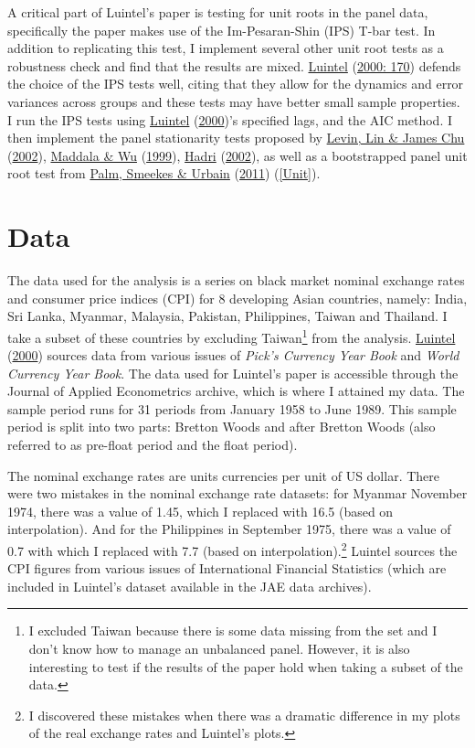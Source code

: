 \documentclass[11pt,preprint, authoryear]{elsarticle}
\numberwithin{equation}{section}
\numberwithin{figure}{section}
\numberwithin{table}{section}
\let\rmarkdownfootnote\footnote%
\def\footnote{\protect\rmarkdownfootnote}
\begin{document}
A critical part of Luintel's paper is testing for unit roots in the
panel data, specifically the paper makes use of the Im-Pesaran-Shin
(IPS) T-bar test. In addition to replicating this test, I implement
several other unit root tests as a robustness check and find that the
results are mixed. \protect\hyperlink{ref-Kul}{Luintel}
(\protect\hyperlink{ref-Kul}{2000: 170}) defends the choice of the IPS
tests well, citing that they allow for the dynamics and error variances
across groups and these tests may have better small sample properties. I
run the IPS tests using \protect\hyperlink{ref-Kul}{Luintel}
(\protect\hyperlink{ref-Kul}{2000})'s specified lags, and the AIC
method. I then implement the panel stationarity tests proposed by
\protect\hyperlink{ref-lev}{Levin, Lin \& James Chu}
(\protect\hyperlink{ref-lev}{2002}), \protect\hyperlink{ref-wu}{Maddala
\& Wu} (\protect\hyperlink{ref-wu}{1999}),
\protect\hyperlink{ref-had}{Hadri} (\protect\hyperlink{ref-had}{2002}),
as well as a bootstrapped panel unit root test from
\protect\hyperlink{ref-pal}{Palm, Smeekes \& Urbain}
(\protect\hyperlink{ref-pal}{2011}) (\ref{Unit}).

\hypertarget{data}{%
\section{\texorpdfstring{Data \label{Data}}{Data }}\label{data}}

The data used for the analysis is a series on black market nominal
exchange rates and consumer price indices (CPI) for 8 developing Asian
countries, namely: India, Sri Lanka, Myanmar, Malaysia, Pakistan,
Philippines, Taiwan and Thailand. I take a subset of these countries by
excluding Taiwan\footnote{I excluded Taiwan because there is some data
  missing from the set and I don't know how to manage an unbalanced
  panel. However, it is also interesting to test if the results of the
  paper hold when taking a subset of the data.} from the analysis.
\protect\hyperlink{ref-Kul}{Luintel} (\protect\hyperlink{ref-Kul}{2000})
sources data from various issues of \emph{Pick's Currency Year Book} and
\emph{World Currency Year Book}. The data used for Luintel's paper is
accessible through the Journal of Applied Econometrics archive, which is
where I attained my data. The sample period runs for 31 periods from
January 1958 to June 1989. This sample period is split into two parts:
Bretton Woods and after Bretton Woods (also referred to as pre-float
period and the float period).

The nominal exchange rates are units currencies per unit of US dollar.
There were two mistakes in the nominal exchange rate datasets: for
Myanmar November 1974, there was a value of 1.45, which I replaced with
16.5 (based on interpolation). And for the Philippines in September
1975, there was a value of 0.7 with which I replaced with 7.7 (based on
interpolation).\footnote{I discovered these mistakes when there was a
  dramatic difference in my plots of the real exchange rates and
  Luintel's plots.} Luintel sources the CPI figures from various issues
of International Financial Statistics (which are included in Luintel's
dataset available in the JAE data archives).
\end{document}
